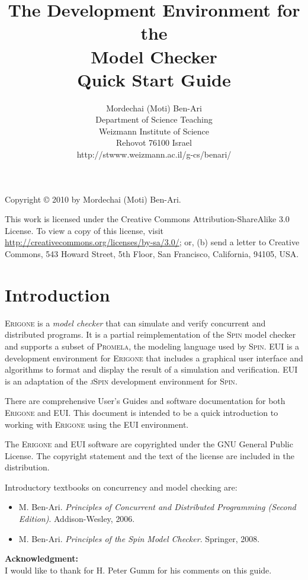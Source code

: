 \documentclass[11pt]{article}
\title{The \eui{} Development Environment for the\\
\prg{} Model Checker\\Quick Start Guide}
\author{Mordechai (Moti) Ben-Ari\\
Department of Science Teaching\\
Weizmann Institute of Science\\
Rehovot 76100 Israel\\
\textsf{http://stwww.weizmann.ac.il/g-cs/benari/}}
\newcommand*{\prg}{\textsc{Erigone}}
\newcommand*{\eui}{\textsc{EUI}}
\newcommand*{\spn}{\textsc{Spin}}
\newcommand*{\jsp}{\textsc{jSpin}}
\newcommand*{\prm}{\textsc{Promela}}
\begin{document}
\maketitle
\thispagestyle{empty}

\vfill

\begin{center}
Copyright \copyright{} 2010 by Mordechai (Moti) Ben-Ari.
\end{center}
This work is licensed under the Creative Commons Attribution-ShareAlike 3.0
License. To view a copy of this license, visit
\url{http://creativecommons.org/licenses/by-sa/3.0/}; or, (b) send a letter
to Creative Commons, 543 Howard Street, 5th Floor, San Francisco,
California, 94105, USA.

\newpage

\section{Introduction}

\prg{} is a \emph{model checker} that can simulate and verify concurrent
and distributed programs. It is a partial reimplementation of the \spn{}
model checker and supports a subset of \prm{}, the modeling language
used by \spn{}. \eui{} is a development environment for \prg{} that
includes a graphical user interface and algorithms to format and display
the result of a simulation and verification. \eui{} is an adaptation of the
\jsp{} development environment for \spn{}.

There are comprehensive User's Guides and software documentation for
both \prg{} and \eui{}. This document is intended to be a quick
introduction to working with \prg{} using the \eui{} environment.

The \prg{} and \eui{} software are copyrighted under the \textsc{GNU}
General Public License. The copyright statement and the text of the
license are included in the distribution.

Introductory textbooks on concurrency and model checking are:

\begin{itemize}
\item M. Ben-Ari. \textit{Principles of Concurrent and Distributed Programming (Second
Edition)}. Addison-Wesley, 2006.
\item M. Ben-Ari. \textit{Principles of the Spin Model Checker}.
Springer, 2008.
\end{itemize}

\textbf{Acknowledgment:}\\I would like to thank for H. Peter Gumm for
his comments on this guide.
\end{document}
